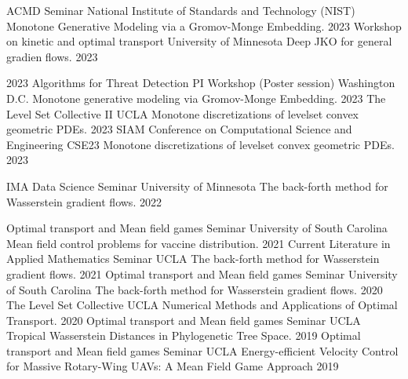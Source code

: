 \begin{cvtalks}
\cvtalk
    {ACMD Seminar} %
    {National Institute of Standards and Technology (NIST)}
    {Monotone Generative Modeling via a Gromov-Monge Embedding.} %
    {2023} %
\cvtalk
    {Workshop on kinetic and optimal transport} %
    {University of Minnesota}
    {Deep JKO for general gradien flows.} %
    {2023} %
  
  \cvtalk
    {2023 Algorithms for Threat Detection PI Workshop (Poster session)} %
    {Washington D.C.}
    {Monotone generative modeling via Gromov-Monge Embedding.} %
    {2023} %
  \cvtalk
    {The Level Set Collective II} %
    {UCLA}
    {Monotone discretizations of levelset convex geometric PDEs.} %
    {2023} %
  \cvtalk
    {SIAM Conference on Computational Science and Engineering } %
    {CSE23}
    {Monotone discretizations of levelset convex geometric PDEs.} %
    {2023} %

  \cvtalk
    {IMA Data Science Seminar} %
    {University of Minnesota}
    {The back-forth method for Wasserstein gradient flows.} %
    {2022} %

  \cvtalk
    {Optimal transport and Mean field games Seminar} %
    {University of South Carolina}
    {Mean field control problems for vaccine distribution.} %
    {2021} %
  \cvtalk
    {Current Literature in Applied Mathematics Seminar} %
    {UCLA}
    {The back-forth method for Wasserstein gradient flows.} %
    {2021} %
  \cvtalk
    {Optimal transport and Mean field games Seminar} %
    {University of South Carolina}
    {The back-forth method for Wasserstein gradient flows.} %
    {2020} %
  \cvtalk
    {The Level Set Collective} %
    {UCLA}
    {Numerical Methods and Applications of Optimal Transport.} %
    {2020} %
  \cvtalk
    {Optimal transport and Mean field games Seminar} %
    {UCLA}
    {Tropical Wasserstein Distances in Phylogenetic Tree Space.} %
    {2019} %
    \cvtalk
    {Optimal transport and Mean field games Seminar} %
    {UCLA}
    {Energy-efficient Velocity Control for Massive Rotary-Wing UAVs: A Mean Field Game Approach} %
    {2019} %
\end{cvtalks}
\endgroup


